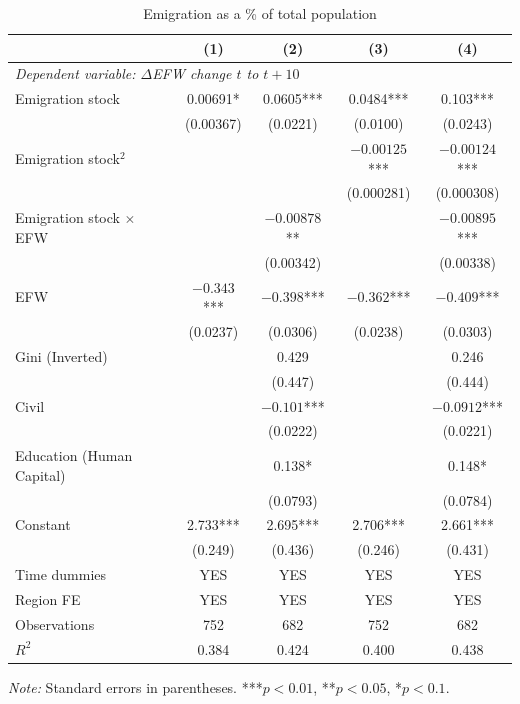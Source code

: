 \documentclass[12pt]{article}
\begin{document}
\begin{table}[H]
\centering
\caption{Emigration as a \% of total population}
\label{tab:stocks_ols}
\begin{threeparttable}
\begin{tabular}{@{}lcccc@{}}
\toprule
 & (1) & (2) & (3) & (4) \\
\midrule
\multicolumn{5}{l}{\textit{Dependent variable: $\Delta$EFW change $t$ to $t+10$}} \\[4pt]
Emigration stock & 0.00691* & 0.0605*** & 0.0484*** & 0.103*** \\
 & (0.00367) & (0.0221) & (0.0100) & (0.0243) \\[2pt]
Emigration stock$^2$ & & & $-0.00125$*** & $-0.00124$*** \\
 & & & (0.000281) & (0.000308) \\[2pt]
Emigration stock $\times$ EFW & & $-0.00878$** & & $-0.00895$*** \\
 & & (0.00342) & & (0.00338) \\[2pt]
EFW & $-0.343$*** & $-0.398$*** & $-0.362$*** & $-0.409$*** \\
 & (0.0237) & (0.0306) & (0.0238) & (0.0303) \\[2pt]
Gini (Inverted) & & 0.429 & & 0.246 \\
 & & (0.447) & & (0.444) \\[2pt]
Civil & & $-0.101$*** & & $-0.0912$*** \\
 & & (0.0222) & & (0.0221) \\[2pt]
Education (Human Capital) & & 0.138* & & 0.148* \\
 & & (0.0793) & & (0.0784) \\[2pt]
Constant & 2.733*** & 2.695*** & 2.706*** & 2.661*** \\
 & (0.249) & (0.436) & (0.246) & (0.431) \\[4pt]
Time dummies & YES & YES & YES & YES \\
Region FE & YES & YES & YES & YES \\
Observations & 752 & 682 & 752 & 682 \\
$R^2$ & 0.384 & 0.424 & 0.400 & 0.438 \\
\bottomrule
\end{tabular}
\begin{tablenotes}
\small
\item \textit{Note:} Standard errors in parentheses. ***$p<0.01$, **$p<0.05$, *$p<0.1$.
\end{tablenotes}
\end{threeparttable}
\end{table}
\end{document}
